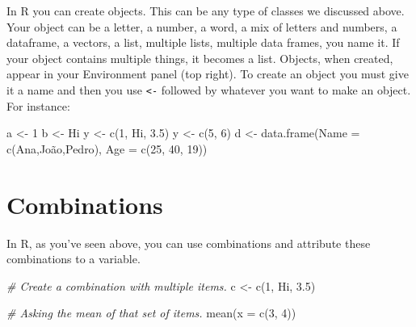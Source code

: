 \documentclass[
]{book}
\newenvironment{Shaded}{\begin{snugshade}}{\end{snugshade}}
\newcommand{\AttributeTok}[1]{\textcolor[rgb]{0.77,0.63,0.00}{#1}}
\newcommand{\CommentTok}[1]{\textcolor[rgb]{0.56,0.35,0.01}{\textit{#1}}}
\newcommand{\DecValTok}[1]{\textcolor[rgb]{0.00,0.00,0.81}{#1}}
\newcommand{\FloatTok}[1]{\textcolor[rgb]{0.00,0.00,0.81}{#1}}
\newcommand{\FunctionTok}[1]{\textcolor[rgb]{0.00,0.00,0.00}{#1}}
\newcommand{\NormalTok}[1]{#1}
\newcommand{\OtherTok}[1]{\textcolor[rgb]{0.56,0.35,0.01}{#1}}
\newcommand{\StringTok}[1]{\textcolor[rgb]{0.31,0.60,0.02}{#1}}
\begin{document}
In R you can create objects.
This can be any type of classes we discussed above.
Your object can be a letter, a number, a word, a mix of letters and numbers, a dataframe, a vectors, a list, multiple lists, multiple data frames, you name it.
If your object contains multiple things, it becomes a list.
Objects, when created, appear in your Environment panel (top right).
To create an object you must give it a name and then you use \texttt{\textless{}-} followed by whatever you want to make an object.\\
For instance:

\begin{Shaded}
\begin{Highlighting}[]
\NormalTok{a }\OtherTok{\textless{}{-}} \DecValTok{1}
\NormalTok{b }\OtherTok{\textless{}{-}} \StringTok{\textquotesingle{}Hi\textquotesingle{}}
\NormalTok{y }\OtherTok{\textless{}{-}} \FunctionTok{c}\NormalTok{(}\DecValTok{1}\NormalTok{, }\StringTok{\textquotesingle{}Hi\textquotesingle{}}\NormalTok{, }\FloatTok{3.5}\NormalTok{)}
\NormalTok{y }\OtherTok{\textless{}{-}} \FunctionTok{c}\NormalTok{(}\DecValTok{5}\NormalTok{, }\DecValTok{6}\NormalTok{)}
\NormalTok{d }\OtherTok{\textless{}{-}} \FunctionTok{data.frame}\NormalTok{(}\StringTok{\textquotesingle{}Name\textquotesingle{}} \OtherTok{=} \FunctionTok{c}\NormalTok{(}\StringTok{\textquotesingle{}Ana\textquotesingle{}}\NormalTok{,}\StringTok{\textquotesingle{}João\textquotesingle{}}\NormalTok{,}\StringTok{\textquotesingle{}Pedro\textquotesingle{}}\NormalTok{), }\StringTok{\textquotesingle{}Age\textquotesingle{}} \OtherTok{=} \FunctionTok{c}\NormalTok{(}\DecValTok{25}\NormalTok{, }\DecValTok{40}\NormalTok{, }\DecValTok{19}\NormalTok{))}
\end{Highlighting}
\end{Shaded}

\hypertarget{combinations}{%
\section{Combinations}\label{combinations}}

In R, as you've seen above, you can use combinations and attribute these combinations to a variable.

\begin{Shaded}
\begin{Highlighting}[]
\CommentTok{\# Create a combination with multiple items.}
\NormalTok{c }\OtherTok{\textless{}{-}} \FunctionTok{c}\NormalTok{(}\DecValTok{1}\NormalTok{, }\StringTok{\textquotesingle{}Hi\textquotesingle{}}\NormalTok{, }\FloatTok{3.5}\NormalTok{)}

\CommentTok{\# Asking the mean of that set of items.}
\FunctionTok{mean}\NormalTok{(}\AttributeTok{x =} \FunctionTok{c}\NormalTok{(}\DecValTok{3}\NormalTok{, }\DecValTok{4}\NormalTok{))}
\end{Highlighting}
\end{Shaded}
\end{document}
